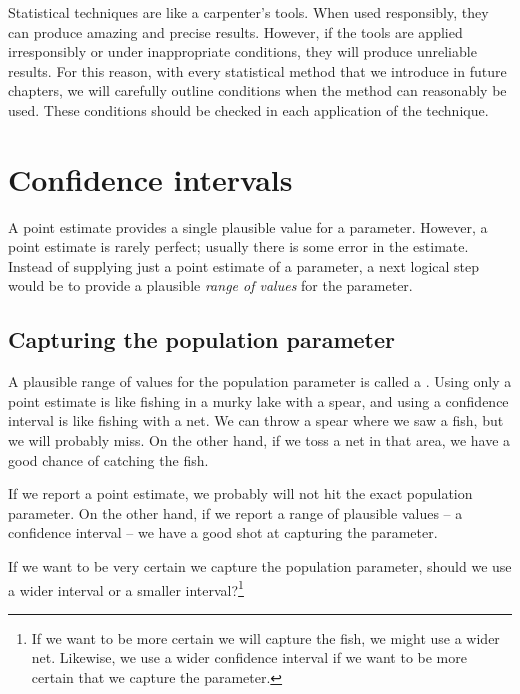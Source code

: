 Statistical techniques are like a carpenter's tools. When used responsibly, they can produce amazing and precise results. However, if the tools are applied irresponsibly or under inappropriate conditions, they will produce unreliable results. For this reason, with every statistical method that we introduce in future chapters, we will carefully outline conditions when the method can reasonably be used. These conditions should be checked in each application of the technique.


\section{Confidence intervals}
\label{ConfidenceIntervals}


A point estimate provides a single plausible value for a parameter. However, a point estimate is rarely perfect; usually there is some error in the estimate. Instead of supplying just a point estimate of a parameter, a next logical step would be to provide a plausible \emph{range of values} for the parameter.


\subsection{Capturing the population parameter}

A plausible range of values for the population parameter is called a . Using only a point estimate is like fishing in a murky lake with a spear, and using a confidence interval is like fishing with a net. We can throw a spear where we saw a fish, but we will probably miss. On the other hand, if we toss a net in that area, we have a good chance of catching the fish.

If we report a point estimate, we probably will not hit the exact population parameter. On the other hand, if we report a range of plausible values -- a confidence interval -- we have a good shot at capturing the parameter.

\begin{exercise}
If we want to be very certain we capture the population parameter, should we use a wider interval or a smaller interval?\footnote{If we want to be more certain we will capture the fish, we might use a wider net. Likewise, we use a wider confidence interval if we want to be more certain that we capture the parameter.}
\end{exercise}


